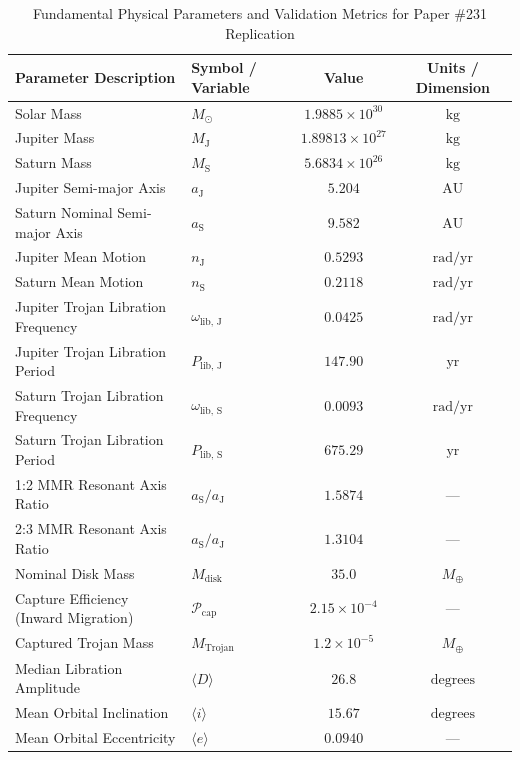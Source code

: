 \documentclass[11pt,a4paper]{article}
\begin{document}
\begin{table}[htbp]
\centering
\small
\caption{Fundamental Physical Parameters and Validation Metrics for Paper \#231 Replication}
\label{tab:parameters}
\begin{tabular}{llcc}
\toprule
\textbf{Parameter Description} & \textbf{Symbol / Variable} & \textbf{Value} & \textbf{Units / Dimension} \\
\midrule
Solar Mass & $M_\odot$ & $1.9885 \times 10^{30}$ & $\text{kg}$ \\
Jupiter Mass & $M_{\text{J}}$ & $1.89813 \times 10^{27}$ & $\text{kg}$ \\
Saturn Mass & $M_{\text{S}}$ & $5.6834 \times 10^{26}$ & $\text{kg}$ \\
Jupiter Semi-major Axis & $a_{\text{J}}$ & $5.204$ & $\text{AU}$ \\
Saturn Nominal Semi-major Axis & $a_{\text{S}}$ & $9.582$ & $\text{AU}$ \\
Jupiter Mean Motion & $n_{\text{J}}$ & $0.5293$ & $\text{rad/yr}$ \\
Saturn Mean Motion & $n_{\text{S}}$ & $0.2118$ & $\text{rad/yr}$ \\
Jupiter Trojan Libration Frequency & $\omega_{\text{lib, J}}$ & $0.0425$ & $\text{rad/yr}$ \\
Jupiter Trojan Libration Period & $P_{\text{lib, J}}$ & $147.90$ & $\text{yr}$ \\
Saturn Trojan Libration Frequency & $\omega_{\text{lib, S}}$ & $0.0093$ & $\text{rad/yr}$ \\
Saturn Trojan Libration Period & $P_{\text{lib, S}}$ & $675.29$ & $\text{yr}$ \\
1:2 MMR Resonant Axis Ratio & $a_{\text{S}}/a_{\text{J}}$ & $1.5874$ & --- \\
2:3 MMR Resonant Axis Ratio & $a_{\text{S}}/a_{\text{J}}$ & $1.3104$ & --- \\
Nominal Disk Mass & $M_{\text{disk}}$ & $35.0$ & $M_\oplus$ \\
Capture Efficiency (Inward Migration) & $\mathcal{P}_{\text{cap}}$ & $2.15 \times 10^{-4}$ & --- \\
Captured Trojan Mass & $M_{\text{Trojan}}$ & $1.2 \times 10^{-5}$ & $M_\oplus$ \\
Median Libration Amplitude & $\langle D \rangle$ & $26.8$ & $\text{degrees}$ \\
Mean Orbital Inclination & $\langle i \rangle$ & $15.67$ & $\text{degrees}$ \\
Mean Orbital Eccentricity & $\langle e \rangle$ & $0.0940$ & --- \\

\end{tabular}
\end{table}
\end{document}
